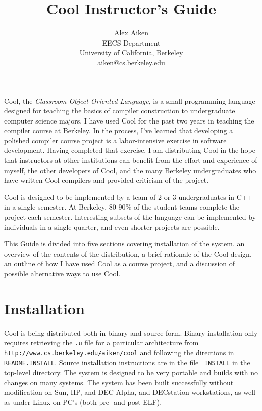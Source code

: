 \documentclass[11pt]{article}
\begin{document}
\title{Cool Instructor's Guide}
\author{Alex Aiken \\ EECS Department \\ University of California, Berkeley \\
aiken@cs.berkeley.edu}
\date{ }
\maketitle

Cool, the {\em Classroom Object-Oriented Language}, is a small
programming language designed for teaching the basics of
compiler construction to undergraduate computer science majors.  I
have used Cool for the past two years in teaching the compiler course
at Berkeley.  In the process, I've learned that developing a polished
compiler course project is a labor-intensive exercise in software
development.  Having completed that exercise, I am distributing Cool in
the hope that instructors at other institutions can benefit from the
effort and experience of myself, the other developers of Cool, and the
many Berkeley undergraduates who have written Cool compilers
and provided criticism of the project.

Cool is designed to be implemented by a team of 2 or 3 undergraduates
in C++ in a single semester.  At Berkeley, 80-90\% of the student
teams complete the project each semester.  Interesting subsets of the
language can be implemented by individuals in a single quarter, and
even shorter projects are possible.

This Guide is divided into five sections covering installation of the
system, an overview of the contents of the distribution, a brief rationale
of the Cool design, an outline of how I have used Cool as a course project,
and a discussion of possible alternative ways to use Cool.  

\section{Installation}

Cool is being distributed both in binary and source form.  Binary
installation only requires retrieving the {\tt .u} file for a
particular architecture from {\tt http://www.cs.berkeley.edu/$\tilde{
}$aiken/cool} and following the directions in {\tt
README.INSTALL}. Source installation instructions are in the file {\tt
INSTALL} in the top-level directory.  The system is designed to be
very portable and builds with no changes on many systems.  The system
has been built successfully without modification on Sun, HP, and DEC
Alpha, and DECstation workstations, as well as under Linux on PC's
(both pre- and post-ELF).
\end{document}
